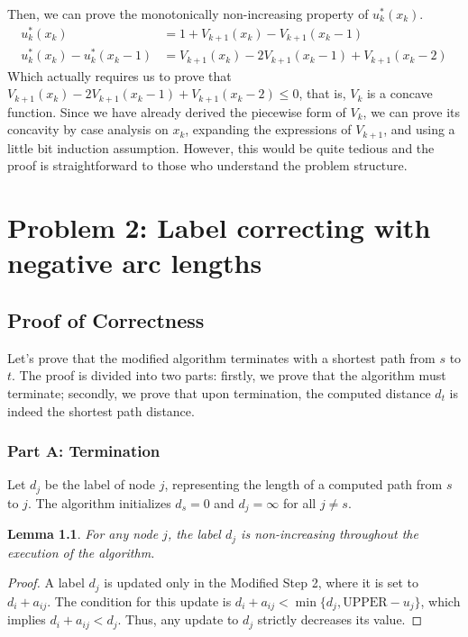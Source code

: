 \documentclass[11pt, a4paper, oneside]{memoir}
\newtheorem{lemma}{Lemma}
\newcommand{\UPPER}{\text{UPPER}}
\begin{document}
Then, we can prove the monotonically non-increasing property of $u_k^*(x_k)$.
\begin{align*}
  u_k^*(x_k)              & = 1 + V_{k+1}(x_k) - V_{k+1}(x_k-1)               \\
  u_k^*(x_k)-u_k^*(x_k-1) & = V_{k+1}(x_k) - 2V_{k+1}(x_k-1) + V_{k+1}(x_k-2)
\end{align*}
Which actually requires us to prove that $V_{k+1}(x_k) - 2V_{k+1}(x_k-1) + V_{k+1}(x_k-2) \leq 0$,
that is, $V_k$ is a concave function. Since we have already derived the piecewise form of $V_k$,
we can prove its concavity by case analysis on $x_k$, expanding the expressions of $V_{k+1}$,
and using a little bit induction assumption.
However, this would be quite tedious and the proof is straightforward to those who understand the problem structure.

\chapter{Problem 2: Label correcting with negative arc lengths}
\section{Proof of Correctness}
Let's prove that the modified algorithm terminates with a shortest path from $s$ to $t$.
The proof is divided into two parts: firstly, we prove that the algorithm must terminate;
secondly, we prove that upon termination, the computed distance $d_t$ is indeed the shortest path distance.

\subsection*{Part A: Termination}
Let $d_j$ be the label of node $j$, representing the length of a computed path from $s$ to $j$.
The algorithm initializes $d_s = 0$ and $d_j = \infty$ for all $j \neq s$.

\begin{lemma}
  For any node $j$, the label $d_j$ is non-increasing throughout the execution of the algorithm.
\end{lemma}

\begin{proof}
  A label $d_j$ is updated only in the Modified Step 2, where it is set to $d_i + a_{ij}$.
  The condition for this update is $d_i + a_{ij} < \min\{d_j, \UPPER - u_j\}$, which implies $d_i + a_{ij} < d_j$.
  Thus, any update to $d_j$ strictly decreases its value.
\end{proof}
\end{document}
